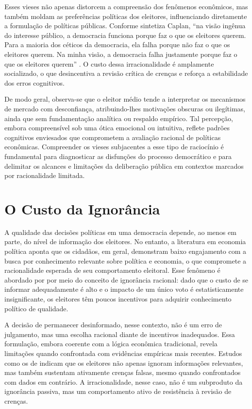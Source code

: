Esses vieses não apenas distorcem a compreensão dos fenômenos econômicos, mas também moldam as preferências políticas dos eleitores, influenciando diretamente a formulação de políticas públicas. Conforme sintetiza Caplan, ``na visão ingênua do interesse público, a democracia funciona porque faz o que os eleitores querem. Para a maioria dos céticos da democracia, ela falha porque não faz o que os eleitores querem. Na minha visão, a democracia falha justamente porque faz o que os eleitores querem'' \cite[p.~3]{The_Myth_of_the_Rational_Voter}. O custo dessa irracionalidade é amplamente socializado, o que desincentiva a revisão crítica de crenças e reforça a estabilidade dos erros cognitivos.

De modo geral, observa-se que o eleitor médio tende a interpretar os mecanismos de mercado com desconfiança, atribuindo-lhes motivações obscuras ou ilegítimas, ainda que sem fundamentação analítica ou respaldo empírico. Tal percepção, embora compreensível sob uma ótica emocional ou intuitiva, reflete padrões cognitivos enviesados que comprometem a avaliação racional de políticas econômicas. Compreender os vieses subjacentes a esse tipo de raciocínio é fundamental para diagnosticar as disfunções do processo democrático e para delimitar os alcances e limitações da deliberação pública em contextos marcados por racionalidade limitada.

\section{O Custo da Ignorância} %


A qualidade das decisões políticas em uma democracia depende, ao menos em parte, do nível de informação dos eleitores. No entanto, a literatura em economia política aponta que os cidadãos, em geral, demonstram baixo engajamento com a busca por conhecimento relevante sobre política e economia, o que compromete a racionalidade esperada de seu comportamento eleitoral. Esse fenômeno é abordado por  por meio do conceito de ignorância racional: dado que o custo de se informar adequadamente é alto e o impacto de um único voto é estatisticamente insignificante, os eleitores têm poucos incentivos para adquirir conhecimento político de qualidade.

A decisão de permanecer desinformado, nesse contexto, não é um erro de julgamento, mas uma escolha racional diante de incentivos inadequados. Essa formulação, embora coerente com a lógica econômica tradicional, revela limitações quando confrontada com evidências empíricas mais recentes. Estudos como os de  indicam que os eleitores não apenas ignoram informações relevantes, mas também sustentam ativamente crenças falsas, mesmo quando confrontados com dados em contrário. A irracionalidade, nesse caso, não é um subproduto da ignorância passiva, mas um comportamento ativo de resistência à revisão de crenças.

